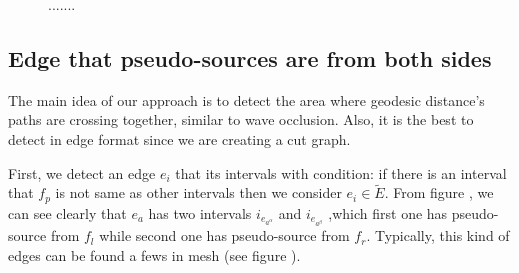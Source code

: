 \documentclass[a4paper,twoside]{article}
\begin{document}
\begin{figure}[h!]
	\centering		
	\hspace{0.00\columnwidth}
	\hspace{0.00\columnwidth}
	\caption[]{.......}
	\label{fig:fig-two-type-edges}
\end{figure}


\subsection{Edge that pseudo-sources are from both sides}
\label{subsec:pseudo-sources laid on both side of adjacent faces}
The main idea of our approach is to detect the area where geodesic distance's paths are crossing together, similar to wave occlusion. Also, it is the best to detect in edge format since we are creating a cut graph.

First, we detect an edge $e_i$ that its intervals with condition: if there is an interval that $f_p$ is not same as other intervals then we consider $e_i \in \tilde{E}$. From figure , we can see clearly that $e_a$ has two intervals $i_{e_{a^\alpha}}$ and $i_{e_{a^\beta}}$ ,which first one has pseudo-source from $f_l$ while second one has pseudo-source from $f_r$. Typically, this kind of edges can be found a fews in mesh (see figure ). 
\end{document}
